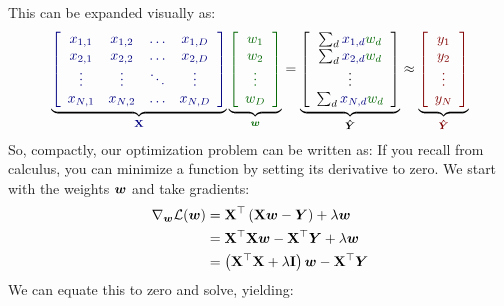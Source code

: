 This can be expanded visually as:
%
\begin{equation}
\underbrace{
\textcolor{darkblue}{
\left[
\begin{array}{cccc}
  x_{1,1} & x_{1,2} & \dots & x_{1,D} \\
  x_{2,1} & x_{2,2} & \dots & x_{2,D} \\
  \vdots & \vdots & \ddots & \vdots \\
  x_{N,1} & x_{N,2} & \dots & x_{N,D}
\end{array}
\right]
}}_{\textcolor{darkblue}{\mat X}}
\underbrace{
\textcolor{darkergreen}{
\left[
\begin{array}{c}
  w_{1} \\
  w_{2} \\ 
  \vdots \\
  w_{D}
\end{array}
\right]
}}_{\textcolor{darkergreen}{\vec w}}
=
\underbrace{
\left[
\begin{array}{c}
  \sum_d \textcolor{darkblue}{x_{1,d}} \textcolor{darkergreen}{w_d} \\
  \sum_d \textcolor{darkblue}{x_{2,d}} \textcolor{darkergreen}{w_d} \\
  \vdots \\
  \sum_d \textcolor{darkblue}{x_{N,d}} \textcolor{darkergreen}{w_d}
\end{array}
\right]
}_{\vec{\hat Y}}
\approx
\underbrace{
\textcolor{darkred}{
\left[
\begin{array}{c}
  y_{1} \\
  y_{2} \\ 
  \vdots \\
  y_{N}
\end{array}
\right]
}}_{\textcolor{darkred}{\vec{\hat Y}}}
\end{equation}
%
So, compactly, our optimization problem can be written as:
%
%
If you recall from calculus, you can minimize a function by setting
its derivative to zero.  We start with the weights ${\boldsymbol{w}}$ and take
gradients:
%
\begin{align}
\nabla_{\boldsymbol{w}} \mathcal{L}({\boldsymbol{w}})
&= \text{\bf X} {}^\top \left( \text{\bf X} {\boldsymbol{w}} - \boldsymbol{Y} \right) + \lambda {\boldsymbol{w}} \\
&= \text{\bf X} {}^\top \text{\bf X} {\boldsymbol{w}} - \text{\bf X} {}^\top \boldsymbol{Y} + \lambda {\boldsymbol{w}} \\
&= \left( \text{\bf X} {}^\top \text{\bf X} + \lambda \mathbf{I} \right) {\boldsymbol{w}} - \text{\bf X} {}^\top \boldsymbol{Y}
\end{align}
%
We can equate this to zero and solve, yielding:
